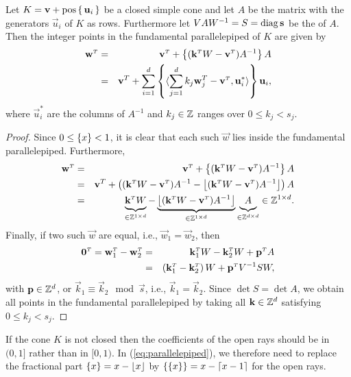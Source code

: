 \begin{lemma}
\label{l:fundamental}
Let $K = \vec v + \poshull \lb\, \vec u_i \,\rb$ be a closed simple cone
and let $A$ be the matrix with the generators $\vec u_i$ of $K$
as rows.
Furthermore let $V A W^{-1} = S = \diag \vec s$ be the  of $A$.
Then the integer points in the fundamental parallelepiped of $K$ are given
by
\begin{eqnarray}
\label{eq:parallelepiped}
\vec w^\T & = & \vec v^\T + \fractional{(\vec k^\T W - \vec v^\T) A^{-1}} A
\\
\nonumber
& = &
\vec v^T +
\sum_{i=1}^d
    \fractional{\sps{\sum_{j=1}^d k_j \vec w^T_j - \vec v^\T}{\vec u^*_i}} \vec u_i,
\end{eqnarray}
where $\vec u^*_i$ are the columns of $A^{-1}$ and $k_j \in \mathbb{Z}$ ranges
over $0 \le k_j < s_j$.
\end{lemma}

\begin{proof}
Since $0 \le \left\{x\right\} < 1$, it is clear that each such $\vec w$
lies inside the fundamental parallelepiped.
Furthermore,
\begin{eqnarray*}
\vec w^\T & = & \vec v^\T + \fractional{(\vec k^\T W - \vec v^\T) A^{-1}} A
\\
& = &
\vec v^T + 
\left(
(\vec k^\T W - \vec v^\T) A^{-1} - \floor{(\vec k^\T W - \vec v^\T) A^{-1}}
\right) A
\\
& = &
\underbrace{\vec k^\T W\mathstrut}_{\in \ZZ^{1\times d}}
-
\underbrace{\floor{(\vec k^\T W - \vec v^\T) A^{-1}}}_{\in \ZZ^{1\times d}}
\underbrace{A\mathstrut}_{\in \ZZ^{d\times d}} \in \ZZ^{1\times d}.
\end{eqnarray*}
Finally, if two such $\vec w$ are equal, i.e., $\vec w_1 = \vec w_2$,
then
\begin{eqnarray*}
\vec 0^\T = \vec w_1^\T - \vec w_2^\T
& = & \vec k_1^\T W - \vec k_2^\T W + \vec p^\T A
\\
& = & \left(\vec k_1^\T - \vec k_2^\T \right) W + \vec p^\T V^{-1} S W,
\end{eqnarray*}
with $\vec p \in \ZZ^d$,
or $\vec k_1 \equiv \vec k_2 \mod \vec s$, i.e., $\vec k_1 = \vec k_2$.
Since $\det S = \det A$, we obtain all points in the fundamental parallelepiped
by taking all $\vec k \in \ZZ^d$ satisfying $0 \le k_j < s_j$.
\end{proof}

If the cone $K$ is not closed then the coefficients of the open rays
should be in $(0,1]$ rather than in $[0,1)$.
In (\ref{eq:parallelepiped}),
we therefore need to replace the fractional part $\left\{x\right\} = x - \left\lfloor x\right\rfloor$
by $\left\{\left\{x\right\}\right\} = x - \left\lceil x-1\right\rceil$ for the open rays.

